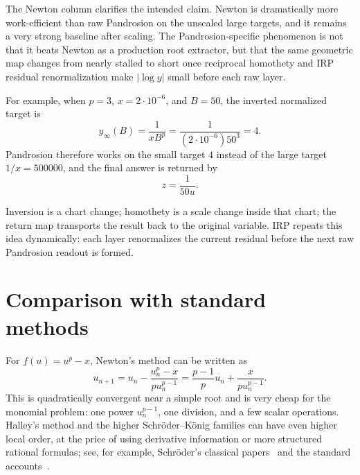 \documentclass[10pt,a4paper]{article}
\theoremstyle{plain}
\theoremstyle{definition}
\theoremstyle{remark}
\newenvironment{takeaway}{%
  \begin{center}\begin{minipage}{0.92\linewidth}\small\itshape\color{blue!45!black}%
}{%
  \end{minipage}\end{center}%
}
\begin{document}
The Newton column clarifies the intended claim.  Newton is dramatically more
work-efficient than raw Pandrosion on the unscaled large targets, and it remains
a very strong baseline after scaling.  The Pandrosion-specific phenomenon is
not that it beats Newton as a production root extractor, but that the same
geometric map changes from nearly stalled to short once reciprocal homothety and IRP residual renormalization make $|\log y|$ small before each raw layer.

For example, when
$p=3$, $x=2\cdot10^{-6}$, and $B=50$, the inverted normalized target is
\[
  y_\infty(B)=\frac{1}{xB^p}
  =\frac{1}{(2\cdot10^{-6})50^3}=4.
\]
Pandrosion therefore works on the small target $4$ instead of the large target
$1/x=500000$, and the final answer is returned by
\[
  z=\frac{1}{50u}.
\]

\begin{takeaway}
Inversion is a chart change; homothety is a scale change inside that chart; the
return map transports the result back to the original variable.  IRP repeats
this idea dynamically: each layer renormalizes the current residual before the
next raw Pandrosion readout is formed.
\end{takeaway}

\section{Comparison with standard methods}
\label{sec:comparison}

For $f(u)=u^p-x$, Newton's method can be written as
\begin{equation}
  u_{n+1}
  =u_n-\frac{u_n^p-x}{p u_n^{p-1}}
  =\frac{p-1}{p}u_n+\frac{x}{p u_n^{p-1}}.
  \label{eq:newton-monomial}
\end{equation}
This is quadratically convergent near a simple root and is very cheap for the
monomial problem: one power $u_n^{p-1}$, one division, and a few scalar
operations.  Halley's method and the higher Schröder--König families can have
even higher local order, at the price of using derivative information or more
structured rational formulas; see, for example, Schröder's classical papers~\cite{schroder1870,schroder1871} and the standard accounts~\cite{traub,householder}.
\end{document}
